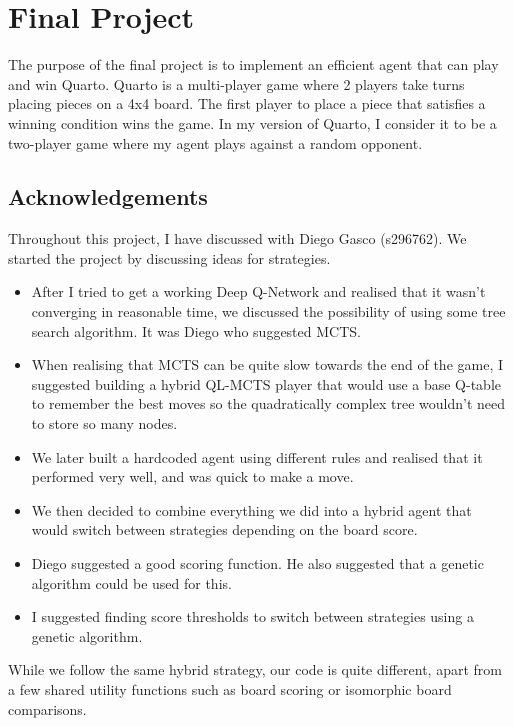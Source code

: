 
\section{Final Project}

The purpose of the final project is to implement an efficient agent that can play and win Quarto. Quarto is a multi-player game where 2 players take turns placing pieces on a 4x4 board. The first player to place a piece that satisfies a winning condition wins the game. In my version of Quarto, I consider it to be a two-player game where my agent plays against a random opponent.

\subsection{Acknowledgements}

Throughout this project, I have discussed with Diego Gasco (s296762). We started the project by discussing ideas for strategies.

\begin{itemize}
    \item After I tried to get a working Deep Q-Network and realised that it wasn't converging in reasonable time, we discussed the possibility of using some tree search algorithm. It was Diego who suggested MCTS.
    \item When realising that MCTS can be quite slow towards the end of the game, I suggested building a hybrid QL-MCTS player that would use a base Q-table to remember the best moves so the quadratically complex tree wouldn't need to store so many nodes.
    \item We later built a hardcoded agent using different rules and realised that it performed very well, and was quick to make a move.
    \item We then decided to combine everything we did into a hybrid agent that would switch between strategies depending on the board score.
    \item Diego suggested a good scoring function. He also suggested that a genetic algorithm could be used for this.
    \item I suggested finding score thresholds to switch between strategies using a genetic algorithm.
\end{itemize}

While we follow the same hybrid strategy, our code is quite different, apart from a few shared utility functions such as board scoring or isomorphic board comparisons.

